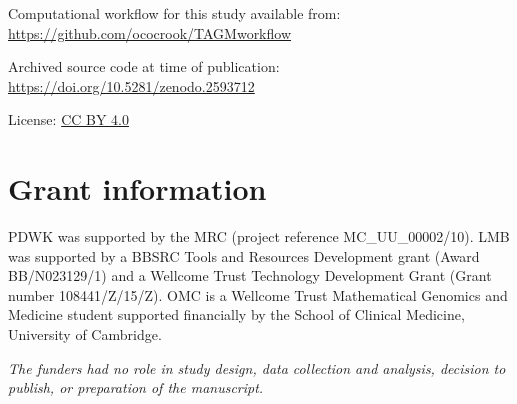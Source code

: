 \documentclass[9pt,a4paper,]{extarticle}
\begin{document}
Computational workflow for this study available from:
\url{https://github.com/ococrook/TAGMworkflow}

Archived source code at time of publication:
\url{https://doi.org/10.5281/zenodo.2593712} \citep{oliver_m_crook_2019_2593712}

License: \href{https://creativecommons.org/licenses/by/4.0/legalcode}{CC BY 4.0}

\hypertarget{grant-information}{%
\section{Grant information}\label{grant-information}}

PDWK was supported by the MRC (project reference MC\_UU\_00002/10). LMB
was supported by a BBSRC Tools and Resources Development grant (Award
BB/N023129/1) and a Wellcome Trust Technology Development Grant (Grant
number 108441/Z/15/Z). OMC is a Wellcome Trust Mathematical Genomics
and Medicine student supported financially by the School of Clinical
Medicine, University of Cambridge.

\emph{The funders had no role in study
design, data collection and analysis, decision to publish, or
preparation of the manuscript.}

\renewcommand\refname{References}
{\small}
\end{document}
